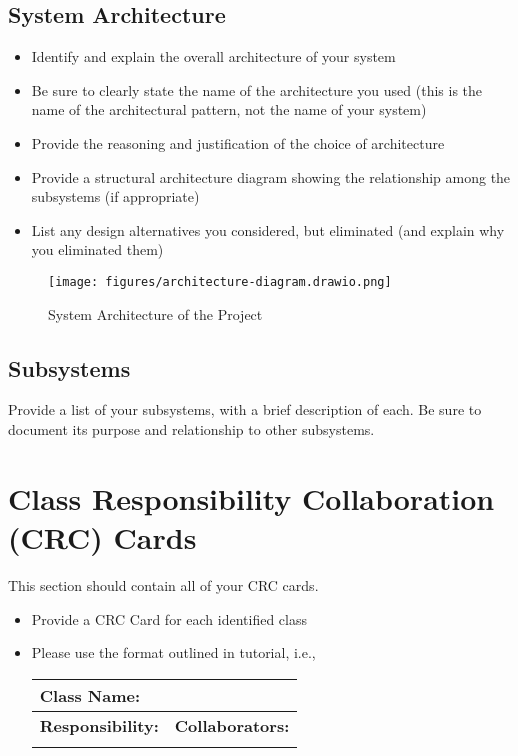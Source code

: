 \documentclass[]{article}
\begin{document}
\subsection{System Architecture}
\label{sub:system_architecture}
\begin{itemize}
	\item Identify and explain the overall architecture of your system
	\item Be sure to clearly state the name of the architecture you used (this is the name of the architectural pattern, not the name of your system)
	\item Provide the reasoning and justification of the choice of architecture
	\item Provide a structural architecture diagram showing the relationship among the subsystems (if appropriate)
	\item List any design alternatives you considered, but eliminated (and explain why you eliminated them)
\end{itemize}

\begin{figure}[H]
	\centering
	\texttt{[image: figures/architecture-diagram.drawio.png]}
	\caption{System Architecture of the Project}
\end{figure}

\subsection{Subsystems}
\label{sub:subsystems}
 Provide a list of your subsystems, with a brief description of each. Be sure to document its purpose and relationship to other subsystems.


	
\section{Class Responsibility Collaboration (CRC) Cards}
\label{sec:class_responsibility_collaboration_crc_cards}
This section should contain all of your CRC cards.

\begin{itemize}
	\item Provide a CRC Card for each identified class
	\item Please use the format outlined in tutorial, i.e., 
	\begin{table}[ht]
		\centering
		\begin{tabular}{|p{5cm}|p{5cm}|}
		\hline 
		 \multicolumn{2}{|l|}{\textbf{Class Name:}} \\
		\hline
		\textbf{Responsibility:} & \textbf{Collaborators:} \\
		\hline
		\vspace{1in} & \\
		\hline
		\end{tabular}
	\end{table}
	
\end{itemize}
\end{document}
